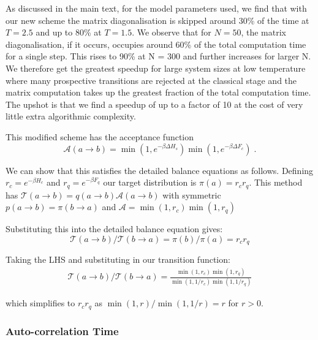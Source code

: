As discussed in the main text, for the model parameters used, we find that with our new scheme the matrix diagonalisation is skipped around 30\% of the time at \(T = 2.5\) and up to 80\% at \(T = 1.5\). We observe that for \(N = 50\), the matrix diagonalisation, if it occurs, occupies around 60\% of the total computation time for a single step. This rises to 90\% at N = 300 and further increases for larger N. We therefore get the greatest speedup for large system sizes at low temperature where many prospective transitions are rejected at the classical stage and the matrix computation takes up the greatest fraction of the total computation time. The upshot is that we find a speedup of up to a factor of 10 at the cost of very little extra algorithmic complexity.

This modified scheme has the acceptance function \[\mathcal{A}(a \to b) = \min\left(1, e^{-\beta \Delta H_s}\right)\min\left(1, e^{-\beta \Delta F_c}\right)\;.\]

We can show that this satisfies the detailed balance equations as follows. Defining \(r_c = e^{-\beta H_c}\) and \(r_q = e^{-\beta F_q}\) our target distribution is \(\pi(a) = r_c r_q\). This method has \(\mathcal{T}(a\to b) = q(a\to b)\mathcal{A}(a \to b)\) with symmetric \(p(a \to b) = \pi(b \to a)\) and \(\mathcal{A} = \min\left(1, r_c\right) \min\left(1, r_q\right)\)

Substituting this into the detailed balance equation gives: \[\mathcal{T}(a \to b)/\mathcal{T}(b \to a) = \pi(b)/\pi(a) = r_c r_q\]

Taking the LHS and substituting in our transition function: \[\begin{aligned}
\mathcal{T}(a \to b)/\mathcal{T}(b \to a) = \frac{\min\left(1, r_c\right) \min\left(1, r_q\right)}{ \min\left(1, 1/r_c\right) \min\left(1, 1/r_q\right)}\end{aligned}\]

which simplifies to \(r_c r_q\) as \(\min(1,r)/\min(1,1/r) = r\) for \(r > 0\).

\hypertarget{app-mcmc-autocorrelation}{%
\subsubsection{Auto-correlation Time}\label{app-mcmc-autocorrelation}}

